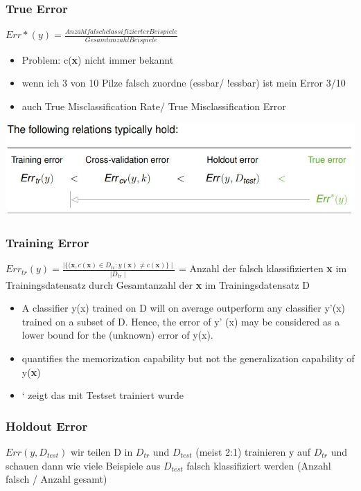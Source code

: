 \documentclass[11pt,a4paper]{article}
\begin{document}
\begin{flushleft}
\subsubsection{True Error}
$ Err*(y) = \frac{Anzahl falsch classifizierter Beispiele}{Gesamtanzahl Beispiele} $
\begin{itemize}
\item Problem: c(\textbf{x}) nicht immer bekannt 
\item wenn ich 3 von 10 Pilze falsch zuordne (essbar/ !essbar) ist mein Error 3/10
\item auch True Misclassification Rate/ True Misclassification Error
\end{itemize}
\includegraphics[width=\textwidth]{Error}
\subsubsection{Training Error}
$Err_{tr}(y) = \frac{\mid \{ (\textbf{x},c(\textbf{x}) \in D_{tr} : y(\textbf{x})\neq c(\textbf{x}) \}\mid}{\mid D_{tr} \mid} $ = Anzahl der falsch klassifizierten \textbf{x} im Trainingsdatensatz durch Gesamtanzahl der \textbf{x} im Trainingsdatensatz D
\begin{itemize}
\item A classifier y(x) trained on D will on average outperform any classifier y’(x) trained on a subset of D. Hence, the error of y’ (x) may be considered as a lower bound for the (unknown) error of y(x).
\item quantifies the memorization capability but not the generalization capability of y(\textbf{x})
\item ‘ zeigt das mit Testset trainiert wurde
\end{itemize}



\subsubsection{Holdout Error}
$ Err(y, D_{test})$ wir teilen D in $D_{tr}$ und $D_{test}$  (meist 2:1) trainieren y auf $D_{tr}$ und schauen dann wie viele Beispiele aus $D_{test}$ falsch klassifiziert werden (Anzahl falsch / Anzahl gesamt)


\end{flushleft}
\end{document}
